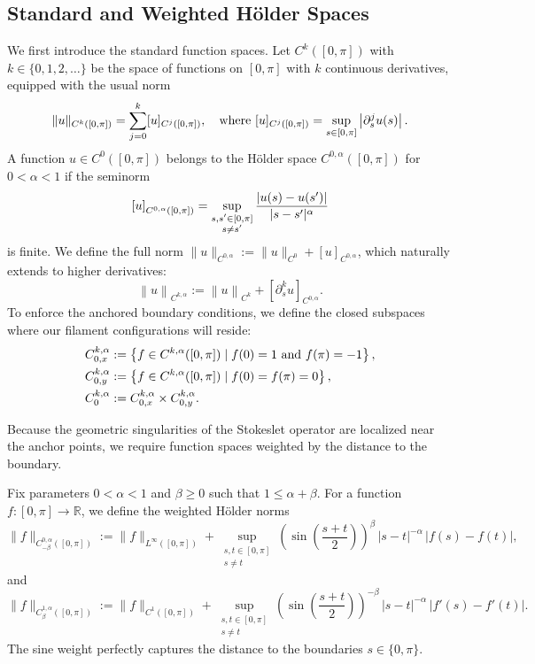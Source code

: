 \documentclass{amsart}
\newcommand{\p}{\partial}
\begin{document}
\subsection{Standard and Weighted Hölder Spaces}

We first introduce the standard function spaces. Let $C^k([0,\pi])$ with $k \in \{0,1,2,\ldots\}$ be the space of functions on $[0,\pi]$ with $k$ continuous derivatives, equipped with the usual norm
\[
\| u \|_{C^k([0,\pi])} = \sum_{j=0}^k [u]_{C^j([0,\pi])}, \quad \hbox{where } [u]_{C^j([0,\pi])} = \sup_{s \in [0,\pi]} \left| \p^j_s u(s) \right|.
\]
A function $u\in C^0([0,\pi])$ belongs to the Hölder space $C^{0,\alpha}([0,\pi])$ for $0 < \alpha < 1$ if the seminorm
\[
\left[ u \right]_{{C}^{0,\alpha}([0,\pi])} 
= \sup_{\substack{s, s' \in [0,\pi] \\ s \neq s'}} { |u(s) - u(s') | \over |s - s'|^\alpha} 
\]
is finite. We define the full norm $\| u \|_{C^{0,\alpha}} := \| u \|_{C^0} + [ u ]_{{C}^{0,\alpha}}$, which naturally extends to higher derivatives:
\[
\left\| u \right\|_{C^{k,\alpha}} := \left\| u \right\|_{C^{k}} + \left[ \p_s^k u \right]_{{C}^{0,\alpha}}.
\]
To enforce the anchored boundary conditions, we define the closed subspaces where our filament configurations will reside:
\begin{align*}
C^{k,\alpha}_{0,x} & := \left\{ f \in C^{k,\alpha}([0,\pi]) \mid f(0) = 1 \hbox{ and } f(\pi) = -1 \right\}, \\
C^{k,\alpha}_{0,y} & := \left\{ f \in C^{k,\alpha}([0,\pi]) \mid f(0) = f(\pi) = 0 \right\}, \\
C^{k,\alpha}_{0} & := C^{k,\alpha}_{0,x} \times C^{k,\alpha}_{0,y}.
\end{align*}

Because the geometric singularities of the Stokeslet operator are localized near the anchor points, we require function spaces weighted by the distance to the boundary. 

Fix parameters $0<\alpha<1$ and $\beta\ge0$ such that $1\le \alpha+\beta$. For a function $f:[0,\pi]\to\mathbb R$, we define the weighted Hölder norms
\[
\|f\|_{C^{0,\alpha}_{-\beta}([0,\pi])}
:=\|f\|_{L^\infty([0,\pi])}+\sup_{\substack{s,t\in[0,\pi]\\ s\ne t}}
\left(\sin\left(\frac{s+t}{2}\right)\right)^{\beta}\,|s-t|^{-\alpha}\,|f(s)-f(t)|,
\]
and
\[
\|f\|_{C^{1,\alpha}_{\beta}([0,\pi])}
:=\|f\|_{C^1([0,\pi])}+\sup_{\substack{s,t\in[0,\pi]\\ s\ne t}}
\left(\sin\left(\frac{s+t}{2}\right)\right)^{-\beta}\,|s-t|^{-\alpha}\,|f'(s)-f'(t)|.
\]
The sine weight perfectly captures the distance to the boundaries $s \in \{0, \pi\}$. 
\end{document}
